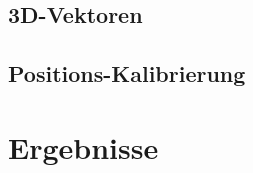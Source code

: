 \documentclass[12pt, ngerman]{article}
\begin{document}
\subsection{3D-Vektoren}
\subsection{Positions-Kalibrierung}


\section{Ergebnisse}
\end{document}
